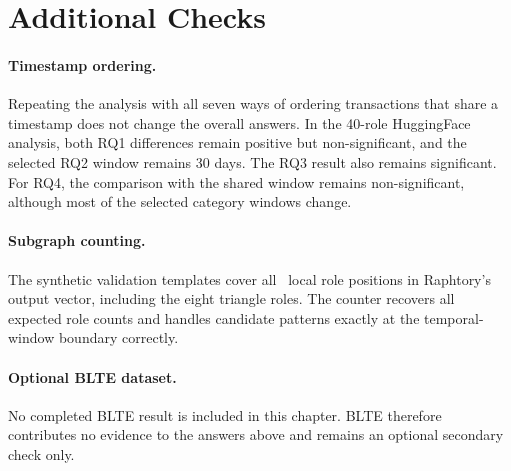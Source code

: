 \section{Additional Checks}

\paragraph{Timestamp ordering.} Repeating the analysis with all seven ways of
ordering transactions that share a timestamp does not change the overall
answers. In the 40-role HuggingFace analysis, both RQ1 differences remain
positive but non-significant, and the selected RQ2 window remains 30 days. The
RQ3 result also remains significant. For RQ4, the comparison with the shared
window remains non-significant, although most of the selected category windows
change.

\paragraph{Subgraph counting.} The synthetic validation templates cover all
\ResSyntheticRoles\ local role positions in Raphtory's output vector, including
the eight triangle roles. The counter recovers all expected role counts and
handles candidate patterns exactly at the temporal-window boundary correctly.

\paragraph{Optional BLTE dataset.} No completed BLTE result is included in this
chapter. BLTE therefore contributes no evidence to the answers above and remains
an optional secondary check only.

